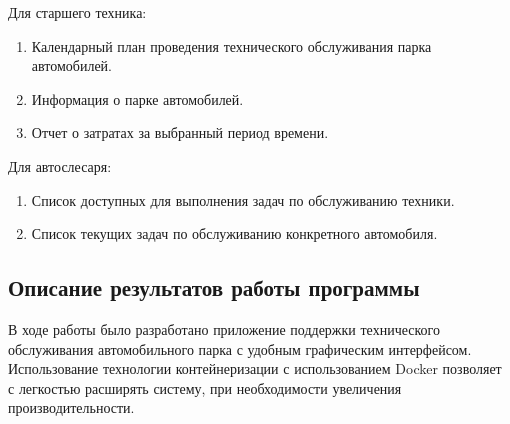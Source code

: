 \documentclass[../nirs.tex]{subfiles}
\begin{document}
    Для старшего техника:
    \begin{enumerate}
        \item Календарный план проведения технического обслуживания парка
            автомобилей.
        \item Информация о парке автомобилей.
        \item Отчет о затратах за выбранный период времени.
    \end{enumerate}

    Для автослесаря:
    \begin{enumerate}
        \item Список доступных для выполнения задач по обслуживанию техники.
        \item Список текущих задач по обслуживанию конкретного автомобиля.
    \end{enumerate}

    \subsection{Описание результатов работы программы}

    В ходе работы было разработано приложение поддержки технического
    обслуживания автомобильного парка с удобным графическим
    интерфейсом. Использование технологии контейнеризации с использованием
    Docker позволяет с легкостью расширять систему, при необходимости увеличения
    производительности.
\end{document}
